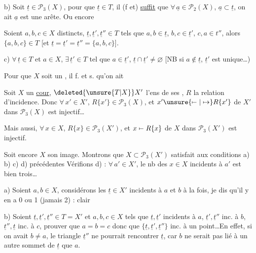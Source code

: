 b) Soit $\underline t\in\mathcal P_3(X)$, pour que $\underline t\in T$, il (f et) \uline{suffit} que $\forall\,\underline a\in\mathcal P_2(X)$, $\underline a\subset\underline t$, on ait $\underline a$ est une arête. Ou encore

Soient $a,b,c\in X$ distincts,  $\underline t,\underline t',\underline t''\in T$ tels que $a,b\in\underline t$, $b,c\in\underline t'$, $c,a\in t''$, alors $\{a,b,c\}\in T$ [et $\underline t=\underline t'=\underline t''=\{a,b,c\}$].

c) $\forall\,\underline t\in T$ et $a\in X$, $\exists\,\underline t'\in T$ tel que $a\in\underline t'$, $\underline t\cap\underline t'\ne\varnothing$ [NB si $a\notin\underline t$, $\underline t'$ est unique\ldots)

Pour que $X$ soit un \uline{}, il f. et s. qu'on ait


Soit $X$ un \uline{cour}, $\deleted{\unsure{T|X}}X'$ l'ens de ses , $R$ la relation d'incidence. Donc $\forall\,x'\in X'$, $R\{x'\}\in\mathcal P_3(X)$, et $x'\unsure{\mapstochar\relbar|\mapsto}R\{x'\}$ de $X'$ dans $\mathcal P_3(X)$ est injectif\ldots

Mais aussi, $\forall\,x\in X$, $R\{x\}\in\mathcal P_3(X')$, et $x\mapstochar\relbar R\{x\}$ de $X$ dans $\mathcal P_3(X')$ est injectif.

Soit encore $X$ son image. Montrons que $X\subset\mathcal P_3(X')$ satisfait aux conditions a) b) c) d) précédentes
Vérifions d) : $\forall\,a'\in X'$, le nb des $x\in X$ incidents à $a'$ est bien trois\ldots

a) Soient $a,b\in X$,  considérons les $\underline t\in X'$ incidents à $a$ et $b$ à la fois, je dis qu'il y en a 0 ou 1 (jamais 2) : clair

b) Soient $\underline t,\underline t',\underline t''\in T=X'$  et $a,b,c\in X$ tels que $\underline t,\underline t'$ incidents à $a$, $\underline t',\underline t''$ inc. à $b$, $\underline t'',\underline t$ inc. à $c$, prouver que $a=b=c$ donc que $\{\underline t,\underline t',\underline t''\}$ inc. à un  point\ldots En effet, si on avait $b\ne a$, le triangle $\underline t''$ ne pourrait rencontrer $\underline t$, car $b$ ne serait pas lié à un autre sommet de $\underline t$ que $a$.

